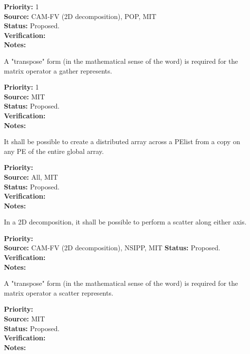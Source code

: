 \begin{reqlist}
{\bf Priority:} 1 \\ 
{\bf Source:} CAM-FV (2D decomposition), POP, MIT \\
{\bf Status:} Proposed. \\
{\bf Verification:} \\
{\bf Notes:} 
\end{reqlist}

A "transpose" form (in the mathematical sense of the word) is required
for the matrix operator a gather represents.
\begin{reqlist}
{\bf Priority:} 1 \\ 
{\bf Source:}  MIT \\
{\bf Status:} Proposed. \\
{\bf Verification:} \\
{\bf Notes:}
\end{reqlist}


It shall be possible to create a distributed array across a PElist
from a copy on any PE of the entire global array.

\begin{reqlist}
{\bf Priority:} \\ 
{\bf Source:} All, MIT \\
{\bf Status:} Proposed. \\
{\bf Verification:} \\
{\bf Notes:} 
\end{reqlist}


In a 2D decomposition, it shall be possible to perform a scatter along
either axis.

\begin{reqlist}
{\bf Priority:} \\ 
{\bf Source:} CAM-FV (2D decomposition), NSIPP, MIT
{\bf Status:} Proposed. \\
{\bf Verification:} \\
{\bf Notes:} 
\end{reqlist}

A "transpose" form (in the mathematical sense of the word) is required
for the matrix operator a scatter represents.
\begin{reqlist}
{\bf Priority:} \\ 
{\bf Source:}  MIT \\
{\bf Status:} Proposed. \\
{\bf Verification:} \\
{\bf Notes:}
\end{reqlist}

